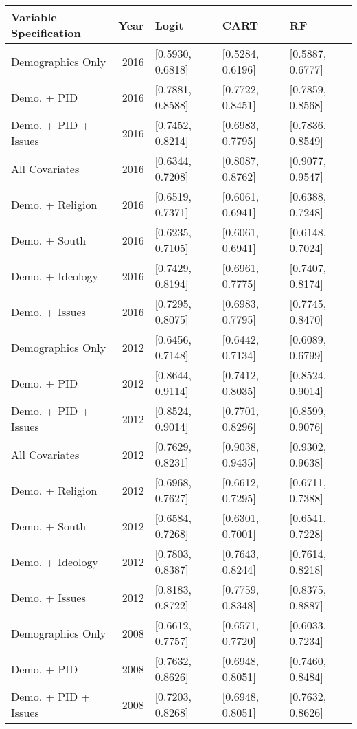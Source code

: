 \begin{longtable}{lrlll}
  \toprule
Variable Specification & Year & Logit & CART & RF \\ 
  \midrule
Demographics Only & 2016 & [0.5930, 0.6818] & [0.5284, 0.6196] & [0.5887, 0.6777] \\ 
  Demo. + PID & 2016 & [0.7881, 0.8588] & [0.7722, 0.8451] & [0.7859, 0.8568] \\ 
  Demo. + PID + Issues & 2016 & [0.7452, 0.8214] & [0.6983, 0.7795] & [0.7836, 0.8549] \\ 
  All Covariates & 2016 & [0.6344, 0.7208] & [0.8087, 0.8762] & [0.9077, 0.9547] \\ 
  Demo. + Religion & 2016 & [0.6519, 0.7371] & [0.6061, 0.6941] & [0.6388, 0.7248] \\ 
  Demo. + South & 2016 & [0.6235, 0.7105] & [0.6061, 0.6941] & [0.6148, 0.7024] \\ 
  Demo. + Ideology & 2016 & [0.7429, 0.8194] & [0.6961, 0.7775] & [0.7407, 0.8174] \\ 
  Demo. + Issues & 2016 & [0.7295, 0.8075] & [0.6983, 0.7795] & [0.7745, 0.8470] \\ 
  Demographics Only & 2012 & [0.6456, 0.7148] & [0.6442, 0.7134] & [0.6089, 0.6799] \\ 
  Demo. + PID & 2012 & [0.8644, 0.9114] & [0.7412, 0.8035] & [0.8524, 0.9014] \\ 
  Demo. + PID + Issues & 2012 & [0.8524, 0.9014] & [0.7701, 0.8296] & [0.8599, 0.9076] \\ 
  All Covariates & 2012 & [0.7629, 0.8231] & [0.9038, 0.9435] & [0.9302, 0.9638] \\ 
  Demo. + Religion & 2012 & [0.6968, 0.7627] & [0.6612, 0.7295] & [0.6711, 0.7388] \\ 
  Demo. + South & 2012 & [0.6584, 0.7268] & [0.6301, 0.7001] & [0.6541, 0.7228] \\ 
  Demo. + Ideology & 2012 & [0.7803, 0.8387] & [0.7643, 0.8244] & [0.7614, 0.8218] \\ 
  Demo. + Issues & 2012 & [0.8183, 0.8722] & [0.7759, 0.8348] & [0.8375, 0.8887] \\ 
  Demographics Only & 2008 & [0.6612, 0.7757] & [0.6571, 0.7720] & [0.6033, 0.7234] \\ 
  Demo. + PID & 2008 & [0.7632, 0.8626] & [0.6948, 0.8051] & [0.7460, 0.8484] \\ 
  Demo. + PID + Issues & 2008 & [0.7203, 0.8268] & [0.6948, 0.8051] & [0.7632, 0.8626] \\ 

\end{longtable}
